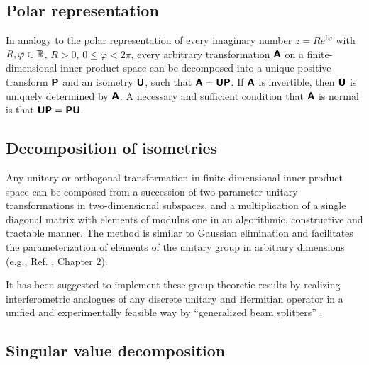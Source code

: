 \subsection{Polar representation}

In analogy to the polar representation of every imaginary number $z= R e^{i\varphi}$ with $R,\varphi \in {\Bbb R}$, $R>0$,
$0\le \varphi < 2\pi$,
every arbitrary transformation $\textsf{\textbf{A}}$ on a finite-dimensional inner product space can be decomposed into
a unique positive transform
$\textsf{\textbf{P}}$ and an isometry
$\textsf{\textbf{U}}$, such that $\textsf{\textbf{A}}= \textsf{\textbf{U}} \textsf{\textbf{P}}$.
If $\textsf{\textbf{A}}$ is invertible, then $\textsf{\textbf{U}}$  is uniquely determined by
$\textsf{\textbf{A}}$.
A necessary and sufficient condition that $\textsf{\textbf{A}}$ is normal is that
$\textsf{\textbf{U}} \textsf{\textbf{P}}=\textsf{\textbf{P}} \textsf{\textbf{U}} $.

\subsection{Decomposition of isometries}

Any unitary or orthogonal transformation   in finite-dimensional inner product space
can be composed from a succession of two-parameter unitary transformations in
two-dimensional subspaces,
and a multiplication of a single diagonal matrix with elements of modulus one
in an algorithmic, constructive and tractable manner.
The method is similar to Gaussian elimination and facilitates the parameterization of elements
of the unitary group  in arbitrary dimensions (e.g., Ref. \cite{murnaghan}, Chapter 2).

{\color{Purple}
It has been suggested to implement
these group theoretic results by realizing interferometric analogues
of any discrete unitary and Hermitian operator
in a unified and experimentally feasible way by ``generalized beam splitters''   \cite{rzbb,reck-94}.}


\subsection{Singular value decomposition}

